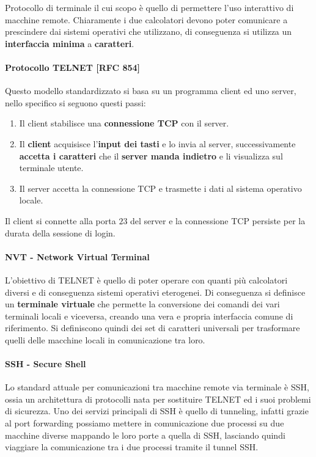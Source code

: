 \documentclass{article}
\begin{document}
Protocollo di terminale il cui scopo è quello di permettere l'uso interattivo di macchine remote.
Chiaramente i due calcolatori devono poter comunicare a prescindere dai sistemi operativi che utilizzano, di conseguenza si utilizza un \textbf{interfaccia minima} a \textbf{caratteri}.

\paragraph{Protocollo TELNET [RFC 854]} Questo modello standardizzato si basa su un programma client ed uno server, nello specifico si seguono questi passi:

\begin{enumerate}
    \item Il client stabilisce una \textbf{connessione TCP} con il server.
    \item Il \textbf{client} acquisisce l'\textbf{input dei tasti} e lo invia al server, successivamente \textbf{accetta i caratteri} che il \textbf{server manda indietro} e li visualizza sul terminale utente.
    \item Il server accetta la connessione TCP e trasmette i dati al sistema operativo locale.
\end{enumerate}

Il client si connette alla porta $23$ del server e la connessione TCP persiste per la durata della sessione di login.

\paragraph{NVT - Network Virtual Terminal} L'obiettivo di TELNET è quello di poter operare con quanti più calcolatori diversi e di conseguenza sistemi operativi eterogenei. Di conseguenza si definisce un
\textbf{terminale virtuale} che permette la conversione dei comandi dei vari terminali locali e viceversa, creando una vera e propria interfaccia comune di riferimento. Si definiscono quindi dei set di caratteri universali per trasformare quelli delle macchine locali in comunicazione tra loro.

\paragraph{SSH - Secure Shell} Lo standard attuale per comunicazioni tra macchine remote via terminale è SSH, ossia un architettura di protocolli nata per sostituire TELNET ed i suoi problemi di sicurezza. Uno dei servizi principali di SSH è quello di tunneling, infatti grazie al port forwarding
possiamo mettere in comunicazione due processi su due macchine diverse mappando le loro porte a quella di SSH, lasciando quindi viaggiare la comunicazione tra i due processi tramite il tunnel SSH.
\end{document}
